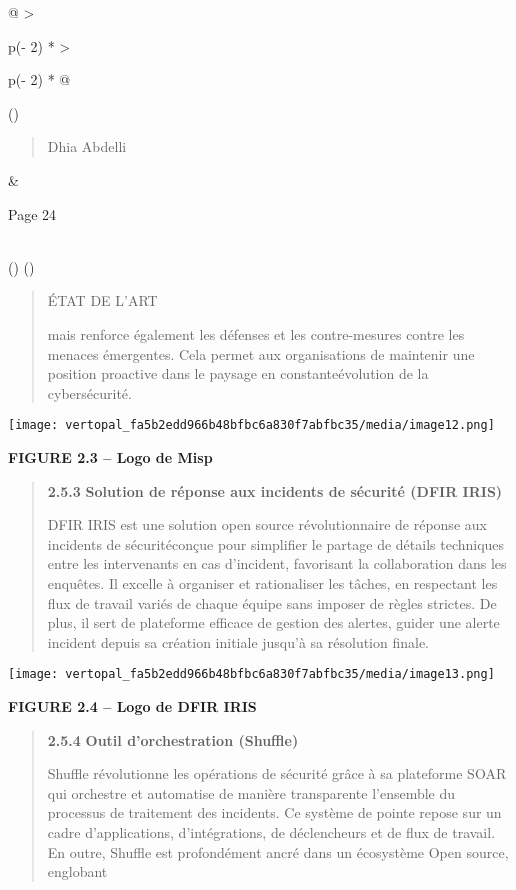 \documentclass[
]{article}
\begin{document}
\begin{longtable}[]{@{}
  >{\raggedright\arraybackslash}p{(\columnwidth - 2\tabcolsep) * }
  >{\raggedright\arraybackslash}p{(\columnwidth - 2\tabcolsep) * }@{}}
\toprule()
\begin{minipage}[b]{\linewidth}\raggedright
\begin{quote}
Dhia Abdelli
\end{quote}
\end{minipage} & \begin{minipage}[b]{\linewidth}\raggedright
Page 24
\end{minipage} \\
\midrule()
\endhead
\bottomrule()
\end{longtable}

\begin{quote}
ÉTAT DE L'ART

mais renforce également les défenses et les contre-mesures contre les
menaces émergentes. Cela permet aux organisations de maintenir une
position proactive dans le paysage en constanteévolution de la
cybersécurité.
\end{quote}

\texttt{[image: vertopal\_fa5b2edd966b48bfbc6a830f7abfbc35/media/image12.png]}

\textbf{FIGURE 2.3 -- Logo de Misp}

\begin{quote}
\textbf{2.5.3} \textbf{Solution de réponse aux incidents de sécurité
(DFIR IRIS)}

DFIR IRIS est une solution open source révolutionnaire de réponse aux
incidents de sécuritéconçue pour simplifier le partage de détails
techniques entre les intervenants en cas d'incident, favorisant la
collaboration dans les enquêtes. Il excelle à organiser et rationaliser
les tâches, en respectant les flux de travail variés de chaque équipe
sans imposer de règles strictes. De plus, il sert de plateforme efficace
de gestion des alertes, guider une alerte incident depuis sa création
initiale jusqu'à sa résolution finale.
\end{quote}

\texttt{[image: vertopal\_fa5b2edd966b48bfbc6a830f7abfbc35/media/image13.png]}

\textbf{FIGURE 2.4 -- Logo de DFIR IRIS}

\begin{quote}
\textbf{2.5.4} \textbf{Outil d'orchestration (Shuffle)}

Shuffle révolutionne les opérations de sécurité grâce à sa plateforme
SOAR qui orchestre et automatise de manière transparente l'ensemble du
processus de traitement des incidents. Ce système de pointe repose sur
un cadre d'applications, d'intégrations, de déclencheurs et de flux de
travail. En outre, Shuffle est profondément ancré dans un écosystème
Open source, englobant
\end{quote}
\end{document}
